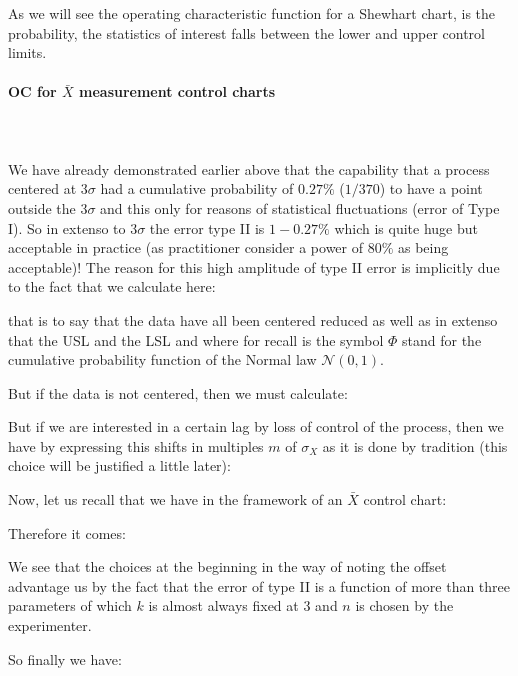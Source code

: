 	As we will see the operating characteristic function for a Shewhart chart, is the probability, the statistics of interest falls between the lower and upper control limits.

	\paragraph{OC for $\bar{X}$ measurement control charts}\mbox{}\\\\
	We have already demonstrated earlier above that the capability that a process centered at $3\sigma$ had a cumulative probability of $0.27\%$ ($1/370$) to have a point outside the $3\sigma$ and this only for reasons of statistical fluctuations (error of Type I). So in extenso to $3\sigma$ the error type II is $1-0.27\%$ which is quite huge but acceptable in practice (as practitioner consider a power of $80\%$ as being acceptable)! The reason for this high amplitude of type II error is implicitly due to the fact that we calculate here:
	
 	that is to say that the data have all been centered reduced as well as in extenso that the USL and the LSL and where for recall is the symbol $\Phi$ stand for the cumulative probability function of the Normal law $\mathcal{N}(0,1)$.

	But if the data is not centered, then we must calculate:
	
 	But if we are interested in a certain lag by loss of control of the process, then we have by expressing this shifts in multiples $m$ of $\sigma_X$ as it is done by tradition (this choice will be justified a little later):
	
 	Now, let us recall that we have in the framework of an $\bar{X}$ control chart:
	
	Therefore it comes:
	
 	We see that the choices at the beginning in the way of noting the offset advantage us by the fact that the error of type II is a function of more than three parameters of which $k$ is almost always fixed at $3$ and $n$ is chosen by the experimenter.

	So finally we have:
	
